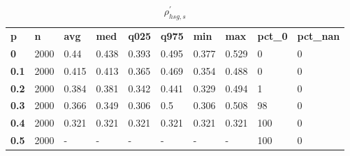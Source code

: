 \begin{table}[h]
 \centering 
\footnotesize
\caption{$\rho_{hsg,s}^\prime $}
\label{tab:alphahsgs}
\begin{tabular}[h]{| l l l l l l l l l l|
    } \hline
\textbf{ p} & \textbf{ n} & \textbf{ avg} & \textbf{ med} & \textbf{ q025} & \textbf{ q975} & \textbf{ min} & \textbf{ max} & \textbf{ pct\_0} & \textbf{ pct\_nan}
           \\
  \textbf{  0} & 2000 &  0.44 & 0.438 & 0.393 & 0.495 & 0.377 & 0.529 &   0 & 0
           \\
  \textbf{0.1} & 2000 & 0.415 & 0.413 & 0.365 & 0.469 & 0.354 & 0.488 &   0 & 0
           \\
  \textbf{0.2} & 2000 & 0.384 & 0.381 & 0.342 & 0.441 & 0.329 & 0.494 &   1 & 0
           \\
  \textbf{0.3} & 2000 & 0.366 & 0.349 & 0.306 &   0.5 & 0.306 & 0.508 &  98 & 0
           \\
  \textbf{0.4} & 2000 & 0.321 & 0.321 & 0.321 & 0.321 & 0.321 & 0.321 & 100 & 0
           \\
  \textbf{0.5} & 2000 & - & - & - & - & - & - & 100 & 0
           \\
 \hline \end{tabular}
 \end{table}
